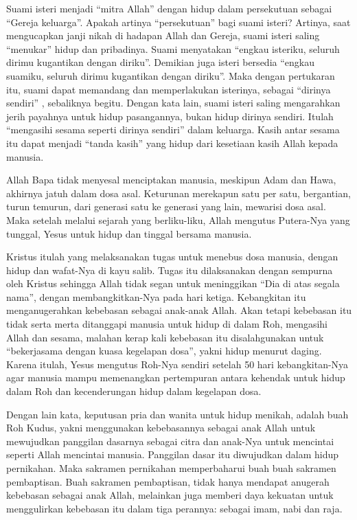     Suami isteri menjadi ``mitra Allah'' dengan hidup dalam persekutuan
    sebagai ``Gereja keluarga''. Apakah artinya ``persekutuan'' bagi suami
    isteri? Artinya, saat mengucapkan janji nikah di hadapan Allah dan
    Gereja, suami isteri saling ``menukar'' hidup dan pribadinya. Suami
    menyatakan ``engkau isteriku, seluruh dirimu kugantikan dengan
    diriku''. Demikian juga isteri bersedia ``engkau suamiku, seluruh
    dirimu kugantikan dengan diriku''. Maka dengan pertukaran itu, suami
    dapat memandang dan memperlakukan isterinya, sebagai ``dirinya
    sendiri'' , sebaliknya begitu. Dengan kata lain, suami isteri saling
    mengarahkan jerih payahnya untuk hidup pasangannya, bukan hidup
    dirinya sendiri. Itulah ``mengasihi sesama seperti dirinya sendiri''
    dalam keluarga. Kasih antar sesama itu dapat menjadi ``tanda kasih''
    yang hidup dari kesetiaan kasih Allah kepada manusia.
    
    Allah Bapa tidak menyesal menciptakan manusia, meskipun Adam dan
    Hawa, akhirnya jatuh dalam dosa asal. Keturunan merekapun satu per
    satu, bergantian, turun temurun, dari generasi satu ke generasi yang
    lain, mewarisi dosa asal. Maka setelah melalui sejarah yang
    berliku-liku, Allah mengutus Putera-Nya yang tunggal, Yesus untuk
    hidup dan tinggal bersama manusia.

    Kristus itulah yang melaksanakan tugas untuk menebus dosa manusia,
    dengan hidup dan wafat-Nya di kayu salib. Tugas itu dilaksanakan
    dengan sempurna oleh Kristus sehingga Allah tidak segan untuk
    meninggikan ``Dia di atas segala nama'', dengan membangkitkan-Nya pada
    hari ketiga. Kebangkitan itu menganugerahkan kebebasan sebagai
    anak-anak Allah. Akan tetapi kebebasan itu tidak serta merta
    ditanggapi manusia untuk hidup di dalam Roh, mengasihi Allah dan
    sesama, malahan kerap kali kebebasan itu disalahgunakan untuk
    ``bekerjasama dengan kuasa kegelapan dosa'', yakni hidup menurut
    daging. Karena itulah, Yesus mengutus Roh-Nya sendiri setelah 50
    hari kebangkitan-Nya agar manusia mampu memenangkan pertempuran
    antara kehendak untuk hidup dalam Roh dan kecenderungan hidup dalam
    kegelapan dosa.
    
    Dengan lain kata, keputusan pria dan wanita untuk hidup menikah,
    adalah buah Roh Kudus, yakni menggunakan kebebasannya sebagai anak
    Allah untuk mewujudkan panggilan dasarnya sebagai citra dan anak-Nya
    untuk mencintai seperti Allah mencintai manusia. Panggilan dasar itu
    diwujudkan dalam hidup pernikahan. Maka sakramen pernikahan
    memperbaharui buah buah sakramen pembaptisan. Buah sakramen
    pembaptisan, tidak hanya mendapat anugerah kebebasan sebagai anak
    Allah, melainkan juga memberi daya kekuatan untuk menggulirkan
    kebebasan itu dalam tiga perannya: sebagai imam, nabi dan raja.

